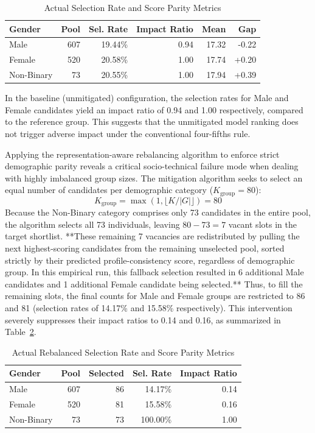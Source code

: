 \documentclass[sigconf]{acmart}
\begin{document}
\begin{table}[h]
\centering
\small
\setlength{\tabcolsep}{3pt}
\caption{Actual Selection Rate and Score Parity Metrics}
\label{tab:parity_metrics}
\begin{tabular}{lrrrrr}
\toprule
\textbf{Gender} & \textbf{Pool} & \textbf{Sel. Rate} & \textbf{Impact Ratio} & \textbf{Mean} & \textbf{Gap} \\
\midrule
Male & 607 & 19.44\% & 0.94 & 17.32 & -0.22 \\
Female & 520 & 20.58\% & 1.00 & 17.74 & +0.20 \\
Non-Binary & 73 & 20.55\% & 1.00 & 17.94 & +0.39 \\
\bottomrule
\end{tabular}
\end{table}

In the baseline (unmitigated) configuration, the selection rates for Male and Female candidates yield an impact ratio of 0.94 and 1.00 respectively, compared to the reference group. This suggests that the unmitigated model ranking does not trigger adverse impact under the conventional four-fifths rule.

Applying the representation-aware rebalancing algorithm to enforce strict demographic parity reveals a critical socio-technical failure mode when dealing with highly imbalanced group sizes. The mitigation algorithm seeks to select an equal number of candidates per demographic category ($K_{\text{group}} = 80$):
\begin{equation}
K_{\text{group}} = \max\left(1, \lfloor K / |G| \rfloor\right) = 80
\end{equation}
Because the Non-Binary category comprises only 73 candidates in the entire pool, the algorithm selects all 73 individuals, leaving $80 - 73 = 7$ vacant slots in the target shortlist. **These remaining 7 vacancies are redistributed by pulling the next highest-scoring candidates from the remaining unselected pool, sorted strictly by their predicted profile-consistency score, regardless of demographic group. In this empirical run, this fallback selection resulted in 6 additional Male candidates and 1 additional Female candidate being selected.** Thus, to fill the remaining slots, the final counts for Male and Female groups are restricted to 86 and 81 (selection rates of 14.17\% and 15.58\% respectively). This intervention severely suppresses their impact ratios to 0.14 and 0.16, as summarized in Table~\ref{tab:rebalanced_parity_metrics}.

\begin{table}[h]
\centering
\small
\setlength{\tabcolsep}{4pt}
\caption{Actual Rebalanced Selection Rate and Score Parity Metrics}
\label{tab:rebalanced_parity_metrics}
\begin{tabular}{lrrrr}
\toprule
\textbf{Gender} & \textbf{Pool} & \textbf{Selected} & \textbf{Sel. Rate} & \textbf{Impact Ratio} \\
\midrule
Male & 607 & 86 & 14.17\% & 0.14 \\
Female & 520 & 81 & 15.58\% & 0.16 \\
Non-Binary & 73 & 73 & 100.00\% & 1.00 \\
\bottomrule
\end{tabular}
\end{table}
\end{document}
